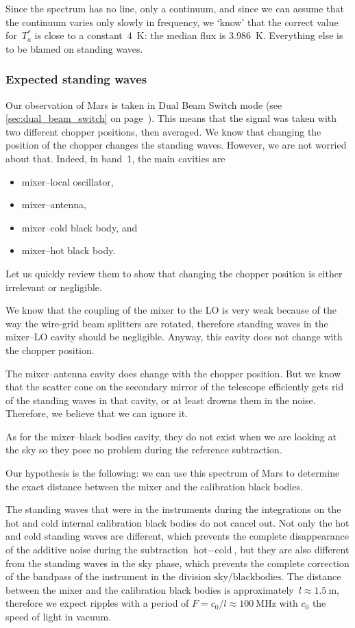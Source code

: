 Since the spectrum has no line, only a continuum, and since we can assume that the continuum varies only slowly in frequency, we `know' that the correct value for~$T_a^*$ is close to a constant~\SI{4}{\kelvin}: the median flux is \SI{3.986}{\kelvin}.
Everything else is to be blamed on standing waves.

\subsubsection{Expected standing waves}
Our observation of Mars is taken in Dual Beam Switch mode (see \cref{sec:dual_beam_switch} on page~\pageref{sec:dual_beam_switch}).
This means that the signal was taken with two different chopper positions, then averaged.
We know that changing the position of the chopper changes the standing waves.
However, we are not worried about that.
Indeed, in band~1, the main cavities are
\begin{itemize}
    \item mixer--local oscillator,
    \item mixer--antenna,
    \item mixer--cold black body, and
    \item mixer--hot black body.
\end{itemize}
Let us quickly review them to show that changing the chopper position is either irrelevant or negligible.

We know that the coupling of the mixer to the LO is very weak because of the way the wire-grid beam splitters are rotated, therefore standing waves in the mixer--LO cavity should be negligible.  Anyway, this cavity does not change with the chopper position.

The mixer--antenna cavity does change with the chopper position.  But we know that the scatter cone on the secondary mirror of the telescope efficiently gets rid of the standing waves in that cavity, or at least drowns them in the noise.
Therefore, we believe that we can ignore it.

As for the mixer--black bodies cavity, they do not exist when we are looking at the sky so they pose no problem during the reference subtraction.

Our hypothesis is the following: we can use this spectrum of Mars to determine the exact distance between the mixer and the calibration black bodies.

The standing waves that were in the instruments during the integrations on the hot and cold internal calibration black bodies do not cancel out.
Not only the hot and cold standing waves are different, which prevents the complete disappearance of the additive noise during the subtraction $\text{hot}-\text{cold}$,
but they are also different from the standing waves in the sky phase, which prevents the complete correction of the bandpass of the instrument in the division $\text{sky}/\text{blackbodies}$.
The distance between the mixer and the calibration black bodies is approximately~$l \approx \SI{1.5}{\meter}$, therefore we expect ripples with a period of $F = c_0/l \approx \SI{100}{\mega\hertz}$ with $c_0$ the speed of light in vacuum.

